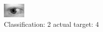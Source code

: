 \begin{figure}[h!]
\begin{center}
\includegraphics[width=0.60\columnwidth]{figures/ID812_class_2_target_4.png}
\end{center}
\caption{ Classification: 2 actual target: 4}
\label{fig:ID812_class_2_target_4}
\end{figure}
